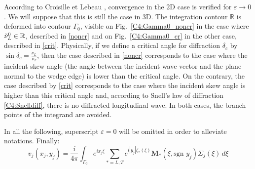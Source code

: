 According to Croisille et Lebeau \cite{CroisilleLebeau}, convergence in the 2D case is verified for $\varepsilon \rightarrow 0$. We will suppose that this is still the case in 3D. The integration contour $\mathbb{R}$ is deformed into contour $\Gamma_{0}$, visible on Fig.~\ref{C4:Gamma0_noncr} in the case where $\tilde{\nu}_L^0\in\mathbb{R}$, described in \eqref{noncr} and on Fig.~\ref{C4:Gamma0_cr} in the other case, described in \eqref{crit}. Physically, if we define a critical angle for diffraction $\delta_c$ by $\sin\delta_c=\frac{\nu_L}{\nu_T}$, then the case described in \eqref{noncr} corresponds to the case where the incident skew angle (the angle between the incident wave vector and the plane normal to the wedge edge) is lower than the critical angle. On the contrary, the case described by \eqref{crit} corresponds to the case where the incident skew angle is higher than this critical angle and, according to Snell's law of diffraction \eqref{C4:Snelldiff}, there is no diffracted longitudinal wave. In both cases, the branch points of the integrand are avoided.

In all the following, superscript $\varepsilon=0$ will be omitted in order to alleviate notations. Finally:
\begin{equation}
v_j(x_j,y_j)=\frac{i}{4\pi}\int_{\Gamma_0} e^{ix_j\xi}\sum_{*=L,T}e^{i|y_j|\zeta_*(\xi)}\mathbf{M_*}(\xi,\mbox{sgn }y_j)\Sigma_j(\xi)\,d\xi
\label{C4:vj0}
\end{equation}


